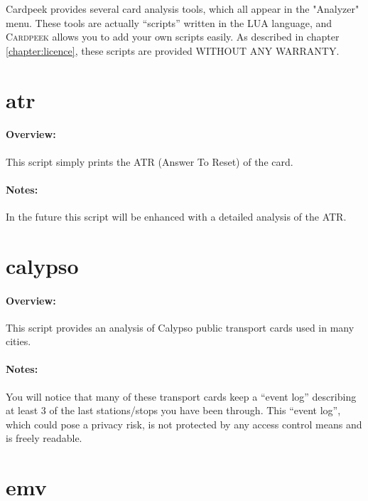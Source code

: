 \documentclass[11pt]{report}
\newcommand{\Cardpeek}{\textsc{Cardpeek}}
\begin{document}
Cardpeek provides several card analysis tools, which all appear in the "Analyzer" menu. 
These tools are actually ``scripts'' written in the LUA language, and \Cardpeek{} allows you to 
add your own scripts easily.
As described in chapter \ref{chapter:licence}, these scripts are provided WITHOUT ANY WARRANTY.

\section{atr}

\paragraph{Overview:}
This script simply prints the ATR (Answer To Reset) of the card.

\paragraph{Notes:}
In the future this script will be enhanced with a detailed analysis of the ATR.

\section{calypso}

\paragraph{Overview:}
This script provides an analysis of Calypso public transport cards used in many cities.

\paragraph{Notes:}
You will notice that many of these transport cards keep a ``event log'' describing at least 3 of the last stations/stops you have been through.
This ``event log'', which could pose a privacy risk, is not protected by any access control means and is freely readable.

\section{emv}
\end{document}

